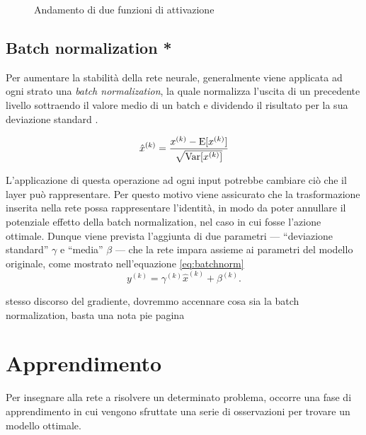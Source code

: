 \begin{figure}[htb]
	\centering
	\quad
	
	\caption{Andamento di due funzioni di attivazione}
	\label{fig:subfig}
\end{figure}


\subsection{Batch normalization *}
\label{subsec:normalization}

Per aumentare la stabilità della rete neurale, generalmente viene applicata ad ogni strato una \emph{batch normalization}, la quale normalizza l'uscita di un precedente livello sottraendo il valore medio di un batch e dividendo il risultato per la sua deviazione standard \cite{ioffe2015batch}.

\begin{equation}
	\hat{x}^{(k)}=\frac{x^{(k)}-\operatorname{E}[x^{(k)}]}{\sqrt{\operatorname{Var}[x^{(k)}]}}
\end{equation}

L'applicazione di questa operazione ad ogni input potrebbe cambiare ciò che il layer può rappresentare. Per questo motivo viene assicurato che la trasformazione inserita nella rete possa rappresentare l'identità, in modo da poter annullare il potenziale effetto della batch normalization, nel caso in cui fosse l'azione ottimale.
Dunque viene prevista l'aggiunta di due parametri --- ``deviazione standard'' $\gamma$ e ``media'' $\beta$ --- che la rete impara assieme ai parametri del modello originale, come mostrato nell'equazione \ref{eq:batchnorm}
\begin{equation}
	y^{(k)}=\gamma^{(k)}\hat{x}^{(k)}+\beta^{(k)}\mbox{.}
	\label{eq:batchnorm}
\end{equation}

{\color{red} stesso discorso del gradiente, dovremmo accennare cosa sia la batch normalization, basta una nota pie pagina}

\section{Apprendimento}
\label{sec:apprendimento}
Per insegnare alla rete a risolvere un determinato problema, occorre una fase di apprendimento in cui vengono sfruttate una serie di osservazioni per trovare un modello ottimale.

